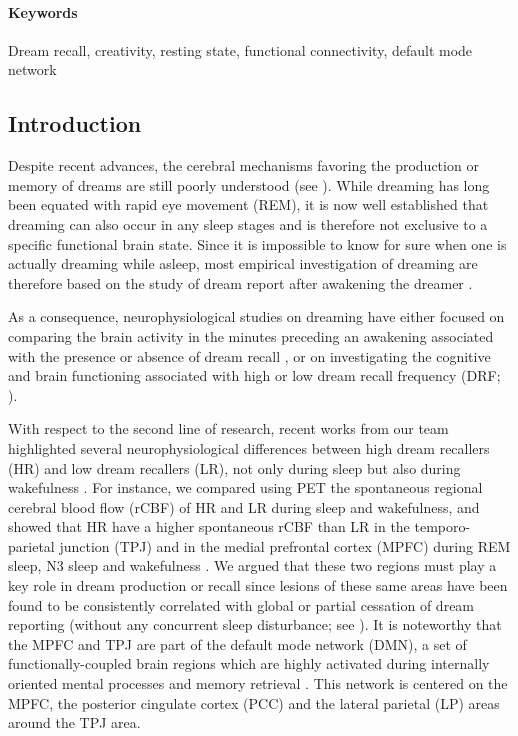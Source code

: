 \paragraph{Keywords}
Dream recall, creativity, resting state, functional connectivity, default mode network

\subsection*{Introduction}
\label{res:inertia:creativity:intro}
Despite recent advances, the cerebral mechanisms favoring the production or memory of dreams are still poorly understood (see \citealp{ruby_experimental_2011}). While dreaming has long been equated with rapid eye movement (REM), it is now well established that dreaming can also occur in any sleep stages and is therefore not exclusive to a specific functional brain state. Since it is impossible to know for sure when one is actually dreaming while asleep, most empirical investigation of dreaming are therefore based on the study of dream report after awakening the dreamer \citep{schwartz_dreaming:_2005}.

As a consequence, neurophysiological studies on dreaming have either focused on comparing the brain activity in the minutes preceding an awakening associated with the presence or absence of dream recall \citep{esposito_reduced_2004, wittmann_nrem_2004, chellappa_cortical_2011, marzano_recalling_2011, scarpelli_state-_2015, siclari_neural_2017}, or on investigating the cognitive and brain functioning associated with high or low dream recall frequency (DRF; \citealp{eichenlaub_brain_2014, eichenlaub_resting_2014}).

With respect to the second line of research, recent works from our team highlighted several neurophysiological differences between high dream recallers (HR) and low dream recallers (LR), not only during sleep but also during wakefulness \citealp{eichenlaub_brain_2014, eichenlaub_resting_2014, vallat_increased_2017}. For instance, we compared using PET the spontaneous regional cerebral blood flow (rCBF) of HR and LR during sleep and wakefulness, and showed that HR have a higher spontaneous rCBF than LR in the temporo-parietal junction (TPJ) and in the medial prefrontal cortex (MPFC) during REM sleep, N3 sleep and wakefulness \citep{eichenlaub_resting_2014}. We argued that these two regions must play a key role in dream production or recall since lesions of these same areas have been found to be consistently correlated with global or partial cessation of dream reporting (without any concurrent sleep disturbance; see \citealp{solms_neuropsychology_1997}). It is noteworthy that the MPFC and TPJ are part of the default mode network (DMN), a set of functionally-coupled brain regions which are highly activated during internally oriented mental processes and memory retrieval \citep{gusnard_searching_2001, raichle_default_2001}. This network is centered on the MPFC, the posterior cingulate cortex (PCC) and the lateral parietal (LP) areas around the TPJ area.

